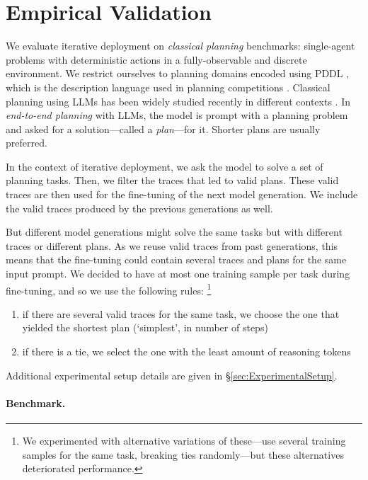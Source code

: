 \section{Empirical Validation}

We evaluate iterative deployment on \emph{classical planning} benchmarks: single-agent problems
with deterministic actions in a fully-observable and discrete environment. We
restrict ourselves to planning domains encoded using PDDL
\citep{mcdermott-et-al-tr1998,haslum-et-al-2019}, which is the description
language used in planning competitions \citep{taitler-et-al-aimag2024}.
Classical planning using LLMs has been widely studied recently in different contexts
. In
\emph{end-to-end planning} with LLMs, the model is prompt with a planning
problem and asked for a solution---called a \emph{plan}---for it. Shorter plans
are usually preferred.

In the context of iterative deployment, we ask the model to solve a set of
planning tasks. Then, we filter the traces that led to valid plans. These valid
traces are then used for the fine-tuning of the next model generation. We include the
valid traces produced by the previous generations as well.

But different model generations might solve the same tasks but with different traces
or different plans. As we reuse valid traces from past generations, this
means that the fine-tuning could contain several traces and plans for the same
input prompt. We decided to have at most one training sample per task during
fine-tuning, and so we use the following rules:
\footnote{
We experimented with alternative variations of these---use several
training samples for the same task, breaking ties randomly---but these
alternatives deteriorated performance. }


\begin{enumerate}
\item if there are several valid traces for the same task, we choose the one that yielded the shortest plan (`simplest', in number of steps)
\item if there is a tie, we select the one with the least amount of reasoning tokens
\end{enumerate}

Additional experimental setup details are given in \S\ref{sec:ExperimentalSetup}.



\paragraph{Benchmark.}

